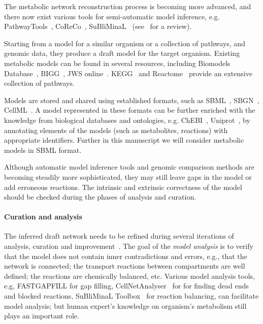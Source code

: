\documentclass{bmcart}
\begin{document}
The metabolic network reconstruction process is becoming more advanced, and there now exist various tools for semi-automatic model inference, e.g. PathwayTools~\cite{Karp2002}, CoReCo~\cite{Pitkanen2014}, SuBliMinaL~\cite{Swainston2011} (see~\cite{Hamilton2014} for a review).

Starting from a model for a similar organism or a collection of pathways, and genomic data, they produce a draft model for the target organism. Existing metabolic models can be found in several resources, including Biomodels Database~\cite{Li10}, BIGG~\cite{Schellenberger2010}, JWS online~\cite{Snoep2003}. KEGG~\cite{Kanehisa12} and Reactome~\cite{Milacic2012, Croft2013} provide an extensive collection of pathways. 

Models are stored and shared using established formats, such as SBML~\cite{Hucka2003}, SBGN~\cite{LeNovere2009}, CellML~\cite{Lloyd2004}. A model represented in these formats can be further enriched with the knowledge from biological databases and ontologies, e.g. ChEBI~\cite{deMatos10}, Uniprot~\cite{TheUniProtConsortium2014}, by annotating elements of the models (such as metabolites, reactions) with appropriate identifiers. Further in this manuscript we will consider metabolic models in SBML format.

Although automatic model inference tools and genomic comparison methods are becoming steadily more sophisticated, they may still leave gaps in the model or add erroneous reactions. The intrinsic and extrinsic correctness of the model should be checked during the phases of analysis and curation.


\paragraph{Curation and analysis}
The inferred draft network needs to be refined during several iterations of analysis, curation and improvement~\cite{Thiele2010,Swainston2011}. The goal of the \emph{model analysis} is to verify that the model does not contain inner contradictions and errors, e.g., that the network is connected; the transport reactions between compartments are well defined; the reactions are chemically balanced, etc. Various model analysis tools, e.g, FASTGAPFILL \cite{Thiele2014} for gap filling, CellNetAnalyser~\cite{Klamt07} for for finding dead ends and blocked reactions, SuBliMinaL Toolbox~\cite{Swainston2011} for reaction balancing, can facilitate model analysis; but human expert's knowledge on organism's metabolism still plays an important role.
\end{document}
